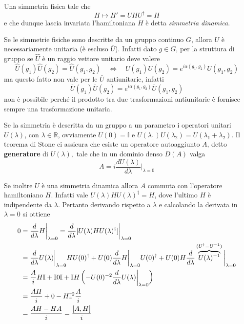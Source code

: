 \documentclass[../../FisicaTeorica.tex]{subfiles}
\begin{document}
\begin{dfn}
Una simmetria fisica tale che
\[
H \mapsto H' = U H U^\dag = H
\]
e che dunque lascia invariata l'hamiltoniana $H$ è detta \emph{simmetria dinamica}.
\end{dfn}

Se le simmetrie fisiche sono descritte da un gruppo continuo $G$, allora $U$ è necessariamente unitaria (è escluso $\overline U$). Infatti dato $g \in G$, per la struttura di gruppo se $\hat U$ è un raggio vettore unitario deve valere
\[
\hat U (g_1) \hat U (g_2) = \hat U (g_1, g_2) \quad \iff \quad U(g_1) U(g_2) = e^{i \alpha (g_1, g_2)} U(g_1, g_2)
\]
ma questo fatto non vale per le $\overline U$ antiunitarie, infatti
\[
\overline U(g_1) \overline U(g_2) = e^{i \alpha (g_1, g_2)} \overline U(g_1, g_2)
\]
non è possibile perché il prodotto tra due trasformazioni antiunitarie è fornisce sempre una trasformazione unitaria.

Se la simmetria è descritta da un gruppo a un parametro i operatori unitari $U(\lambda)$, con $\lambda \in \mathbb R$, ovviamente $U(0) = \mathbb{I}$ e $U(\lambda_1)U(\lambda_2) = U(\lambda_1 + \lambda_2)$. Il teorema di Stone ci assicura che esiste un operatore autoaggiunto $A$, detto \textbf{generatore} di $U(\lambda),$ tale che in un dominio denso $D(A)$ valga
\[
A = i \frac{d U(\lambda)}{d \lambda}\bigg|_{\lambda = 0}
\]

Se inoltre $U$ è una simmetria dinamica allora $A$ commuta con l'operatore hamiltoniano $H$. Infatti vale $U(\lambda) H U(\lambda)^\dag = H$, dove l'ultimo $H$ è indipendente da $\lambda$. Pertanto derivando rispetto a $\lambda$ e calcolando la derivata in $\lambda = 0$ si ottiene
\begin{align}
0 & = \frac{d}{d \lambda} H \bigg|_{\lambda = 0} = \frac{d}{d \lambda} [U(\lambda) H U(\lambda)^\dag] \bigg|_{\lambda = 0} \notag \\
& = \frac{d}{d \lambda} U(\lambda) \bigg|_{\lambda = 0} H U(0)^\dag + U(0) \frac{d}{d \lambda} H \bigg|_{\lambda = 0} U(0)^\dag + U(0) H \frac{d}{d \lambda} \overbrace{U(\lambda)^{-1}}^{(U^\dag = U^{-1})} \bigg|_{\lambda = 0} \notag \\
& = \frac{A}{i} H \mathbb{I} + \mathbb{I} 0 \mathbb{I} + \mathbb{I} H \left(- U(0)^{-2} \frac{d}{d \lambda} U(\lambda) \bigg|_{\lambda = 0} \right) \notag \\
& = \frac{A H}{i} + 0 - H \mathbb{I}^2 \frac{A}{i} \notag \\
& = \frac{AH - HA}{i} = \frac{[A,H]}{i} \notag
\end{align}
\end{document}
